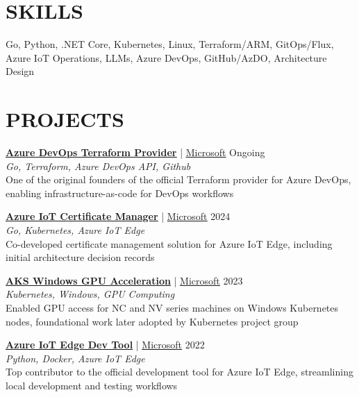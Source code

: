 \documentclass[margin, 10pt, hidelinks]{res} %
\newcommand{\tab}{\hspace*{1em}} %
\newcommand{\emphasize}{\bf} %
\begin{document}
\begin{resume}
    \section{SKILLS}

    Go, Python, .NET Core, Kubernetes, Linux, Terraform/ARM, GitOps/Flux, Azure IoT Operations, LLMs,
    Azure DevOps, GitHub/AzDO, Architecture Design

    \section{PROJECTS}

    \href{https://github.com/microsoft/terraform-provider-azuredevops}{\emphasize\underline{Azure DevOps Terraform Provider}} | \href{https://www.microsoft.com/}{\underline{Microsoft}} \hfill Ongoing \\
    {\it Go, Terraform, Azure DevOps API, Github} \\
    \tab One of the original founders of the official Terraform provider for Azure DevOps, enabling infrastructure-as-code for DevOps workflows

    \href{https://github.com/katriendg/aio-cert-manager}{\emphasize\underline{Azure IoT Certificate Manager}} | \href{https://www.microsoft.com/}{\underline{Microsoft}} \hfill 2024 \\
    {\it Go, Kubernetes, Azure IoT Edge} \\
    \tab Co-developed certificate management solution for Azure IoT Edge, including initial architecture decision records

    \href{https://github.com/marosset/aks-windows-gpu-acceleration/pull/3}{\emphasize\underline{AKS Windows GPU Acceleration}} | \href{https://www.microsoft.com/}{\underline{Microsoft}} \hfill 2023 \\
    {\it Kubernetes, Windows, GPU Computing} \\
    \tab Enabled GPU access for NC and NV series machines on Windows Kubernetes nodes, foundational work later adopted by Kubernetes project group

    \href{https://github.com/Azure/iotedgedev/pulls?q=is\%3Apr\%20author\%3AEliiseS\%20is\%3Aclosed}{\emphasize\underline{Azure IoT Edge Dev Tool}} | \href{https://www.microsoft.com/}{\underline{Microsoft}} \hfill 2022 \\
    {\it Python, Docker, Azure IoT Edge} \\
    \tab Top contributor to the official development tool for Azure IoT Edge, streamlining local development and testing workflows


\end{resume}
\end{document}
